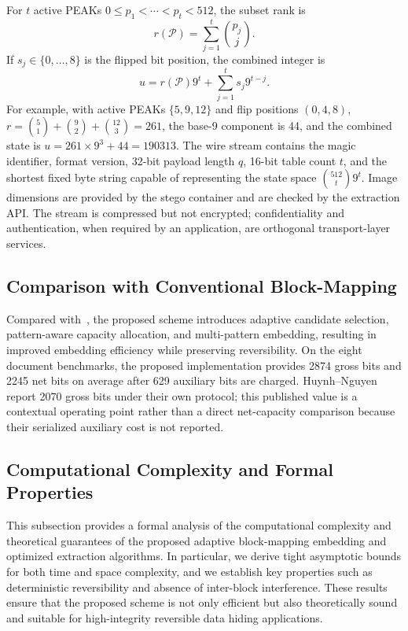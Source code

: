 \documentclass[a4paper,fleqn]{cas-dc}
\begin{document}
For $t$ active PEAKs $0\le p_1<\cdots<p_t<512$, the subset rank is
\[
r(\mathcal P)=\sum_{j=1}^{t}\binom{p_j}{j}.
\]
If $s_j\in\{0,\ldots,8\}$ is the flipped bit position, the combined integer is
\[
u=r(\mathcal P)9^t+\sum_{j=1}^{t}s_j9^{t-j}.
\]
For example, with active PEAKs $\{5,9,12\}$ and flip positions $(0,4,8)$,
$r=\binom51+\binom92+\binom{12}3=261$, the base-9 component is 44, and the
combined state is $u=261\times9^3+44=190313$.
The wire stream contains the magic identifier, format version, 32-bit payload
length $q$, 16-bit table count $t$, and the shortest fixed byte string capable
of representing the state space $\binom{512}{t}9^t$. Image dimensions are
provided by the stego container and are checked by the extraction API. The
stream is compressed but not encrypted; confidentiality and authentication,
when required by an application, are orthogonal transport-layer services.

\subsection{Comparison with Conventional Block-Mapping}

Compared with~\cite{Huynh2025BlockMapping}, the proposed scheme introduces adaptive candidate selection,
pattern-aware capacity allocation, and multi-pattern embedding,
resulting in improved embedding efficiency while preserving reversibility.
On the eight document benchmarks, the proposed implementation provides 2874
gross bits and 2245 net bits on average after 629 auxiliary bits are charged.
Huynh--Nguyen report 2070 gross bits under their own protocol; this published
value is a contextual operating point rather than a direct net-capacity
comparison because their serialized auxiliary cost is not reported.

\subsection{Computational Complexity and Formal Properties}
\label{subsec:complexity-analysis}

This subsection provides a formal analysis of the computational complexity and
theoretical guarantees of the proposed adaptive block-mapping embedding and
optimized extraction algorithms. In particular, we derive tight asymptotic
bounds for both time and space complexity, and we establish key properties such
as deterministic reversibility and absence of inter-block interference. These
results ensure that the proposed scheme is not only efficient but also
theoretically sound and suitable for high-integrity reversible data hiding
applications.
\end{document}
